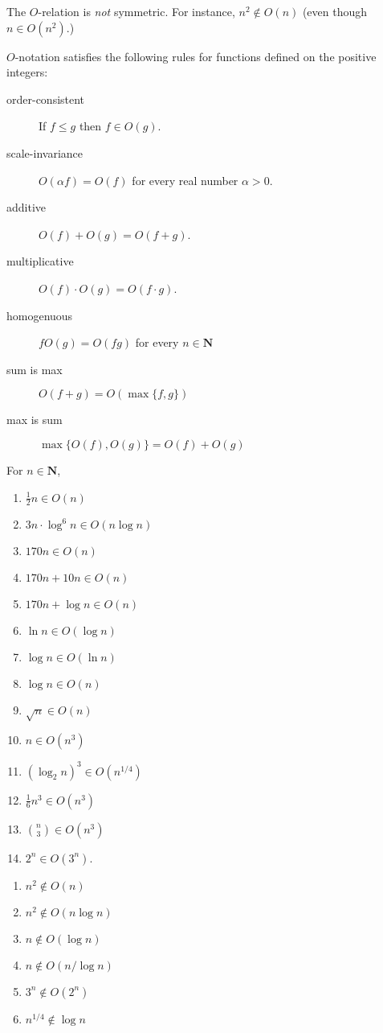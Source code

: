 \documentclass{tstextbook}
\begin{document}
The $O$-relation is \emph{not} symmetric.
For instance, $n^2\notin O(n)$ (even though $n\in O(n^2)$.)

\begin{theorem}[rules] 
  \label{thm: Oh rules}
  $O$-notation satisfies the following rules for functions defined on the positive integers:

  \begin{description}
    \item[order-consistent] If \(f\leq g\) then \(f \in O(g)\).
    \item[scale-invariance] \(O(\alpha f) = O(f)\) for every real number $\alpha > 0$.
    \item[additive] \( O(f)+ O( g) = O(f + g)\).
    \item[multiplicative] \( O(f)\cdot O( g) = O(f \cdot g)\).
    \item[homogenuous] $fO(g) = O(fg)$ for every $n\in \mathbf N$
    \item[sum is max] $O(f + g) = O(\max \{f, g\})$
    \item[max is sum] $\max\{O(f) , O(g)\} = O(f) + O(g)$
  \end{description}
\end{theorem}

\begin{example}
  For $n\in\mathbf N$,
\begin{enumerate}
\item $\frac12 n \in O(n)$
\item $3n \cdot \log^6 n \in O(n\log n)$
\item $170 n \in O(n)$
\item $170 n + 10 n \in O(n)$
\item $170 n + \log n \in O(n)$
\item $\ln n \in O(\log n)$
\item $\log n \in O(\ln n)$
\item $\log n \in O(n)$
\item $\sqrt n \in O(n)$
\item $n \in O(n^3)$
\item $(\log_2 n)^3 \in O(n^{1/4})$
\item $\frac16 n^3 \in O(n^3)$
\item $\binom{n}{3} \in O(n^3)$
\item $2^n \in O(3^n)$.
\end{enumerate}
\end{example}

\begin{example}
  \begin{enumerate}
\item $n^2\notin O(n)$
\item $n^2\notin O(n\log n)$
\item $n\notin O(\log n)$
\item $n\notin O(n/\log n)$
\item $3^n\notin O(2^n)$
\item $n^{1/4}\notin \log n$
  \end{enumerate}
\end{example}
\end{document}
